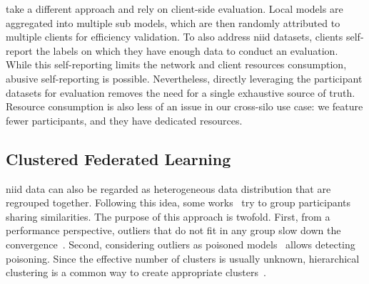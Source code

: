 


\citet{zhao_shielding_2020} take a different approach and rely on client-side evaluation.  
Local models are aggregated into multiple sub models, which are then randomly attributed to multiple clients for efficiency validation. 
To also address \gls{niid} datasets, clients self-report the labels on which they have enough data to conduct an evaluation. 
While this self-reporting limits the network and client resources consumption, abusive self-reporting is possible. 
Nevertheless, directly leveraging the participant datasets for evaluation removes the need for a single exhaustive source of truth. 
Resource consumption is also less of an issue in our cross-silo use case: we feature fewer participants, and they have dedicated resources.

\subsection{Clustered Federated Learning}

\Gls{niid} data can also be regarded as heterogeneous data distribution that are regrouped together. 
Following this idea, some works~\cite{peri_deep_2020,briggs_federated_2020,ouyang_clusterfl_2021,ye_pfedsa_2023} try to group participants sharing similarities. 
The purpose of this approach is twofold. First, from a performance perspective, outliers that do not fit in any group slow down the convergence~\cite{ye_pfedsa_2023}. Second, considering outliers as poisoned models~\cite{peri_deep_2020} allows detecting poisoning.
Since the effective number of clusters is usually unknown, hierarchical clustering is a common way to create appropriate clusters~\cite{briggs_federated_2020,ye_pfedsa_2023}. 

